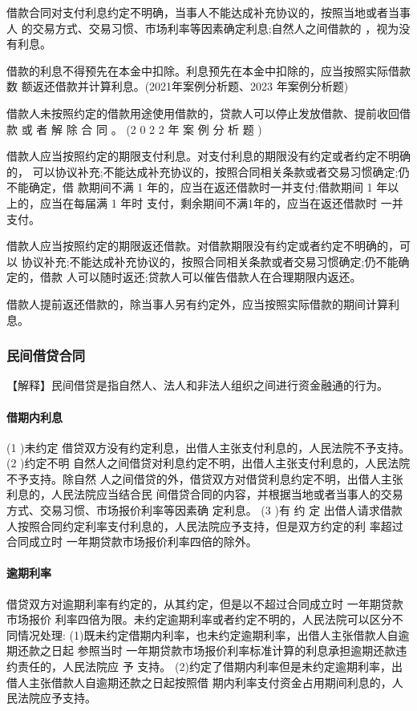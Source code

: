 \documentclass[UTF8,12pt]{ctexart}
\numberwithin{equation}{section} %
\numberwithin{figure}{section}
\numberwithin{table}{section}
\begin{document}
	借款合同对支付利息约定不明确，当事人不能达成补充协议的，按照当地或者当事人 的交易方式、交易习惯、市场利率等因素确定利息;自然人之间借款的 ，视为没有利息。
	
	借款的利息不得预先在本金中扣除。利息预先在本金中扣除的，应当按照实际借款数 额返还借款并计算利息。(2021年案例分析题、2023 年案例分析题)
	
	借款人未按照约定的借款用途使用借款的，贷款人可以停止发放借款、提前收回借款 或 者 解 除 合 同 。 (2 0 2 2 年 案 例 分 析 题 )
	
	借款人应当按照约定的期限支付利息。对支付利息的期限没有约定或者约定不明确的， 可以协议补充;不能达成补充协议的，按照合同相关条款或者交易习惯确定;仍不能确定，借 款期间不满 1 年的，应当在返还借款时一并支付;借款期间 1 年以 上的，应当在每届满 1 年时 支付，剩余期间不满1年的，应当在返还借款时 一并支付。
	
	借款人应当按照约定的期限返还借款。对借款期限没有约定或者约定不明确的，可以 协议补充;不能达成补充协议的，按照合同相关条款或者交易习惯确定;仍不能确定的，借款 人可以随时返还;贷款人可以催告借款人在合理期限内返还。
	
	借款人提前返还借款的，除当事人另有约定外，应当按照实际借款的期间计算利息。
	
	
	\subsubsection{民间借贷合同}
	【解释】民间借贷是指自然人、法人和非法人组织之间进行资金融通的行为。
	\paragraph{借期内利息}
	(1 )未约定
	借贷双方没有约定利息，出借人主张支付利息的，人民法院不予支持。
	(2 )约定不明 自然人之间借贷对利息约定不明，出借人主张支付利息的，人民法院不予支持。除自然 人之间借贷的外，借贷双方对借贷利息约定不明，出借人主张利息的，人民法院应当结合民 间借贷合同的内容，并根据当地或者当事人的交易方式、交易习惯、市场报价利率等因素确 定利息。
	(3 )有 约 定 出借人请求借款人按照合同约定利率支付利息的，人民法院应予支持，但是双方约定的利 率超过合同成立时 一年期贷款市场报价利率四倍的除外。
	
	\paragraph{逾期利率}
	借贷双方对逾期利率有约定的，从其约定，但是以不超过合同成立时 一年期贷款市场报价 利率四倍为限。未约定逾期利率或者约定不明的，人民法院可以区分不同情况处理: (1)既未约定借期内利率，也未约定逾期利率，出借人主张借款人自逾期还款之日起 参照当时 一年期贷款市场报价利率标准计算的利息承担逾期还款违约责任的，人民法院应 予
	支持。 (2)约定了借期内利率但是未约定逾期利率，出借人主张借款人自逾期还款之日起按照借 期内利率支付资金占用期间利息的，人民法院应予支持。
	
\end{document}
